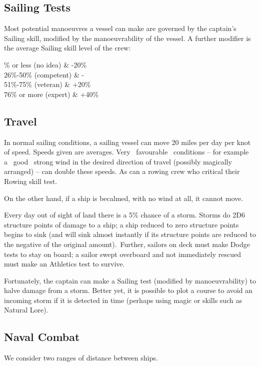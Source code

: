 \subsection{Sailing Tests}
Most potential manoeuvres a vessel can make are governed by the captain’s Sailing skill, modified by the manoeuvrability of the vessel. A further modifier is the average Sailing skill level of the crew:
\begin{table}[H]
\begin{center}
\begin{rpg-table}[|X|Y|]
        \% or less (no idea) & -20\%\\
	26\%-50\% (competent) & -\\
	51\%-75\% (veteran) & +20\%\\
	76\% or more (expert) & +40\%\\
	\hline
\end{rpg-table}
\end{center}
\end{table}


\subsection{Travel}
In normal sailing conditions, a sailing vessel can move 20 miles per day per knot of speed. Speeds given are averages. Very  favourable  conditions – for example a  good  strong wind in the desired direction of travel (possibly magically arranged) – can double these speeds. As can a rowing crew who critical their Rowing skill test. 

On the other hand, if a ship is becalmed, with no wind at all, it cannot move.

Every day out of sight of land there is a 5\% chance of a storm. Storms do 2D6 structure points of damage to a ship; a ship reduced to zero structure points begins to sink (and will sink almost instantly if its structure points are reduced to the negative of the original amount). Further, sailors on deck must make Dodge tests to stay on board; a sailor swept overboard and not immediately rescued must make an Athletics test to survive.

Fortunately, the captain can make a Sailing test (modified by manoeuvrability) to halve damage from a storm. Better yet, it is possible to plot a course to avoid an incoming storm if it is detected in time (perhaps using magic or skills such as Natural Lore).

\subsection{Naval Combat}
We consider two ranges of distance between ships.

